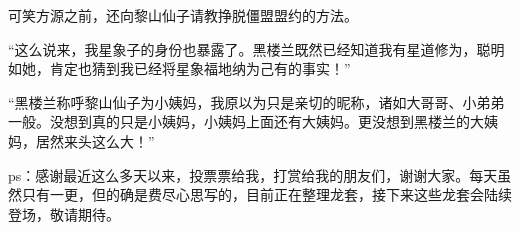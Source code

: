 \begin{this_body}
可笑方源之前，还向黎山仙子请教挣脱僵盟盟约的方法。

“这么说来，我星象子的身份也暴露了。黑楼兰既然已经知道我有星道修为，聪明如她，肯定也猜到我已经将星象福地纳为己有的事实！”

“黑楼兰称呼黎山仙子为小姨妈，我原以为只是亲切的昵称，诸如大哥哥、小弟弟一般。没想到真的只是小姨妈，小姨妈上面还有大姨妈。更没想到黑楼兰的大姨妈，居然来头这么大！”

ps：感谢最近这么多天以来，投票票给我，打赏给我的朋友们，谢谢大家。每天虽然只有一更，但的确是费尽心思写的，目前正在整理龙套，接下来这些龙套会陆续登场，敬请期待。

\end{this_body}

